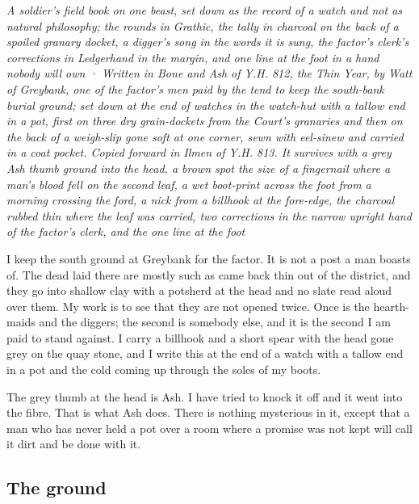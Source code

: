 \documentclass{design/chronicle}
\begin{document}
\clearpage{}
{\centering\FellFont\itshape\footnotesize\color{faded} A soldier’s field book on one beast, set down as the record of a watch and not as natural philosophy; the rounds in Grathic, the tally in charcoal on the back of a spoiled granary docket, a digger’s song in the words it is sung, the factor’s clerk’s corrections in Ledgerhand in the margin, and one line at the foot in a hand nobody will own · Written in Bone and Ash of Y.H. 812, the Thin Year, by Watt of Greybank, one of the factor’s men paid by the tend to keep the south-bank burial ground; set down at the end of watches in the watch-hut with a tallow end in a pot, first on three dry grain-dockets from the Court’s granaries and then on the back of a weigh-slip gone soft at one corner, sewn with eel-sinew and carried in a coat pocket. Copied forward in Ilmen of Y.H. 813. It survives with a grey Ash thumb ground into the head, a brown spot the size of a fingernail where a man’s blood fell on the second leaf, a wet boot-print across the foot from a morning crossing the ford, a nick from a billhook at the fore-edge, the charcoal rubbed thin where the leaf was carried, two corrections in the narrow upright hand of the factor’s clerk, and the one line at the foot\par}\medskip
I keep the south ground at Greybank for the factor. It is not a post a man boasts of. The dead laid there are mostly such as came back thin out of the district, and they go into shallow clay with a potsherd at the head and no slate read aloud over them. My work is to see that they are not opened twice. Once is the hearth-maids and the diggers; the second is somebody else, and it is the second I am paid to stand against. I carry a billhook and a short spear with the head gone grey on the quay stone, and I write this at the end of a watch with a tallow end in a pot and the cold coming up through the soles of my boots.

The grey thumb at the head is Ash. I have tried to knock it off and it went into the fibre. That is what Ash does. There is nothing mysterious in it, except that a man who has never held a pot over a room where a promise was not kept will call it dirt and be done with it.

\subsection*{The ground}
\end{document}
